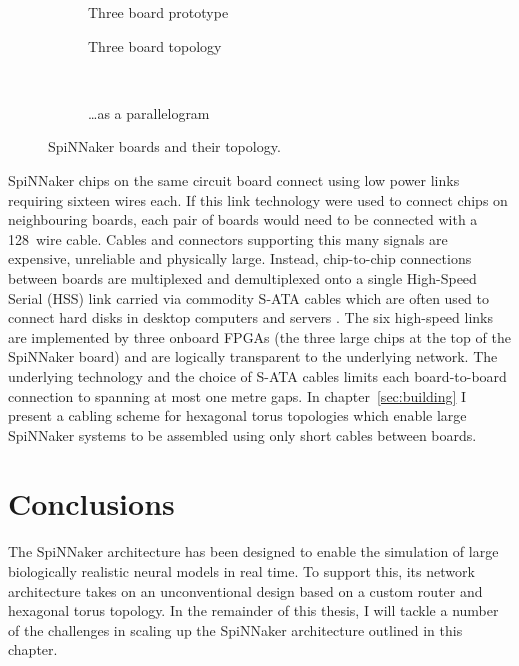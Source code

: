\begin{figure}
\begin{subfigure}[b]{0.45\linewidth}
				\caption{Three board prototype}
				\label{fig:threeboard}
			\end{subfigure}
			
			\vspace*{1em}
			
			\begin{subfigure}[b]{0.45\linewidth}
				\center
				
				\caption{Three board topology}
				\label{fig:threeboard-separate}
			\end{subfigure}
			~~~
			\begin{subfigure}[b]{0.45\linewidth}
				\center
				
				\caption{\ldots{}as a parallelogram}
				\label{fig:threeboard-wrapped}
			\end{subfigure}
			
			\caption{SpiNNaker boards and their topology.}
			\label{fig:spinnaker-boards}
		\end{figure}
		
		
		SpiNNaker chips on the same circuit board connect using low power links
		requiring sixteen wires each.  If this link technology were used to connect
		chips on neighbouring boards, each pair of boards would need to be
		connected with a 128~wire cable.  Cables and connectors supporting this
		many signals are expensive, unreliable and physically large. Instead,
		chip-to-chip connections between boards are multiplexed and demultiplexed
		onto a single High-Speed Serial (HSS) link \cite{athavale05} carried via
		commodity S-ATA cables which are often used to connect hard disks in
		desktop computers and servers \cite{sata3spec}. The six high-speed links
		are implemented by three onboard FPGAs (the three large chips at the top of
		the SpiNNaker board) and are logically transparent to the underlying
		network. The underlying technology and the choice of S-ATA cables limits
		each board-to-board connection to spanning at most one metre gaps. In
		chapter~\ref{sec:building} I present a cabling scheme for hexagonal torus
		topologies which enable large SpiNNaker systems to be assembled using only
		short cables between boards.
		
	\section{Conclusions}
		
		The SpiNNaker architecture has been designed to enable the simulation of
		large biologically realistic neural models in real time. To support this,
		its network architecture takes on an unconventional design based on a
		custom router and hexagonal torus topology. In the remainder of this
		thesis, I will tackle a number of the challenges in scaling up the
		SpiNNaker architecture outlined in this chapter.
